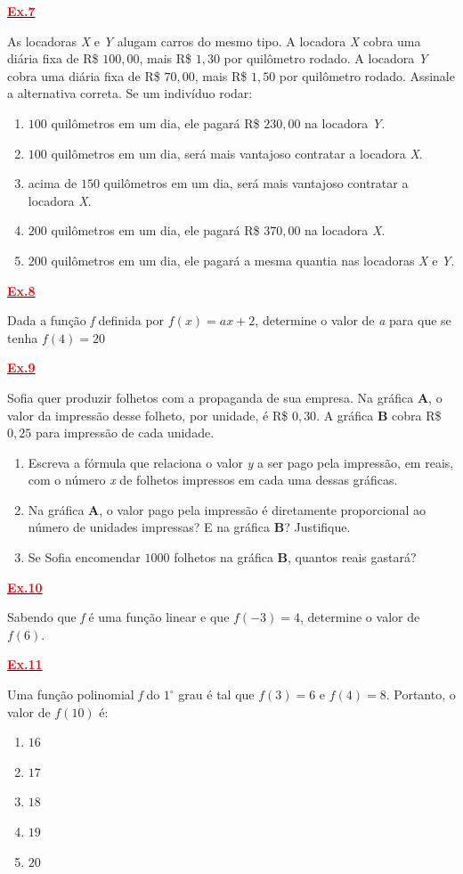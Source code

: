 \documentclass[12pt]{report}
\newcommand{\ex}[1]{\hypertarget{ex#1}{\noindent\hyperlink{gab#1}{\textcolor{red}{\textbf{Ex.#1}}}}}
\begin{document}
\begin{multicols}{2}
\ex{7} As locadoras \textit{X} e \textit{Y} alugam carros do mesmo tipo. A locadora \textit{X} cobra uma diária fixa de R\$ $100,00$, mais R\$ $1,30$ por quilômetro rodado. A locadora \textit{Y} cobra uma diária fixa de R\$ $70,00$, mais R\$ $1,50$ por quilômetro rodado. Assinale a alternativa correta. Se um indivíduo rodar:
\begin{enumerate}[label=\alph*)]
	\item $100$ quilômetros em um dia, ele pagará R\$ $230,00$ na locadora \textit{Y}.
	\item $100$ quilômetros em um dia, será mais vantajoso contratar a locadora \textit{X}.
	\item acima de $150$ quilômetros em um dia, será mais vantajoso contratar a locadora \textit{X}.
	\item $200$ quilômetros em um dia, ele pagará R\$ $370,00$ na locadora \textit{X}.
	\item $200$ quilômetros em um dia, ele pagará a mesma quantia nas locadoras \textit{X} e \textit{Y}.
\end{enumerate}

\ex{8}  Dada a função \textit{f} definida por $f(x) = ax + 2$, determine o valor de \textit{a} para que se tenha $f(4) = 20$

\ex{9}  Sofia quer produzir folhetos com a propaganda de sua empresa. Na gráfica \textbf{A}, o valor da impressão desse folheto, por unidade, é R\$ $0,30$. A gráfica \textbf{B} cobra R\$ $0,25$ para impressão de cada unidade.
\begin{enumerate}[label=\alph*)]
	\item Escreva a fórmula que relaciona o valor \textit{y} a ser pago pela impressão, em reais, com o número \textit{x} de folhetos impressos em cada uma dessas gráficas.
	\item Na gráfica \textbf{A}, o valor pago pela impressão é diretamente proporcional ao número de unidades impressas? E na gráfica \textbf{B}? Justifique.
	\item Se Sofia encomendar $1000$ folhetos na gráfica \textbf{B}, quantos reais gastará?
\end{enumerate}

\ex{10}  Sabendo que \textit{f} é uma função linear e que $f(-3) = 4$, determine o valor de $f(6)$.

\ex{11} Uma função polinomial \textit{f} do $1^\circ$ grau é tal que $f(3) = 6$ e $f(4) = 8$. Portanto, o valor de $f(10)$ é:
\begin{enumerate}[label=\alph*)]
\item $16$
\item $17$
\item $18$
\item $19$
\item $20$
\end{enumerate}


\end{multicols}
\end{document}
